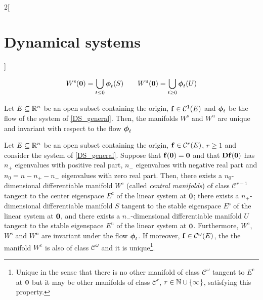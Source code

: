 \documentclass[../../../main_math.tex]{subfiles}
\begin{document}
\begin{multicols}{2}[\section{Dynamical systems}]
\begin{definition}
    $$W^\text{s}(\boldsymbol{\mathrm{0}})=\bigcup_{t\leq 0}\boldsymbol{\mathrm{\phi}}_t(S)\qquad W^\text{u}(\boldsymbol{\mathrm{0}})=\bigcup_{t\geq 0}\boldsymbol{\mathrm{\phi}}_t(U)$$
  \end{definition}
  \begin{proposition}
    Let $E\subseteq\mathbb{R}^n$ be an open subset containing the origin, $\boldsymbol{\mathrm{f}}\in\mathcal{C}^1(E)$ and $\boldsymbol{\mathrm{\phi}}_t$ be the flow of the system of \cref{DS_general}. Then, the manifolds $W^\text{s}$ and $W^\text{u}$ are unique and invariant with respect to the flow $\boldsymbol{\mathrm{\phi}}_t$
  \end{proposition}
  \begin{theorem}
    Let $E\subseteq\mathbb{R}^n$ be an open subset containing the origin, $\boldsymbol{\mathrm{f}}\in\mathcal{C}^r(E)$, $r\geq 1$ and consider the system of \cref{DS_general}. Suppose that $\boldsymbol{\mathrm{f}}(\boldsymbol{\mathrm{0}})=\boldsymbol{\mathrm{0}}$ and that $\boldsymbol{\mathrm{Df}}(\boldsymbol{\mathrm{0}})$ has $n_+$ eigenvalues with positive real part, $n_-$ eigenvalues with negative real part and $n_0=n-n_+-n_-$ eigenvalues with zero real part. Then, there exists a $n_0$-dimensional differentiable manifold $W^\text{c}$ (called \emph{central manifolds}) of class $\mathcal{C}^{r-1}$ tangent to the center eigenspace $E^\text{c}$ of the linear system at $\boldsymbol{\mathrm{0}}$; there exists a $n_+$-dimensional differentiable manifold $S$ tangent to the stable eigenspace $E^\text{s}$ of the linear system at $\boldsymbol{\mathrm{0}}$, and there exists a $n_-$-dimensional differentiable manifold $U$ tangent to the stable eigenspace $E^\text{u}$ of the linear system at $\boldsymbol{\mathrm{0}}$. Furthermore, $W^\text{c}$, $W^\text{s}$ and $W^\text{u}$ are invariant under the flow $\boldsymbol{\mathrm{\phi}}_t$. If moreover, $\boldsymbol{\mathrm{f}}\in\mathcal{C}^\omega(E)$, the the manifold $W^\text{c}$ is also of class $\mathcal{C}^{\omega}$ and it is unique\footnote{Unique in the sense that there is no other manifold of class $\mathcal{C}^{\omega}$ tangent to $E^\text{c}$ at $\boldsymbol{\mathrm{0}}$ but it may be other manifolds of class $\mathcal{C}^{r}$, $r\in\mathbb{N}\cup\{\infty\}$, satisfying this property.}.
  \end{theorem}

\end{multicols}
\end{document}

